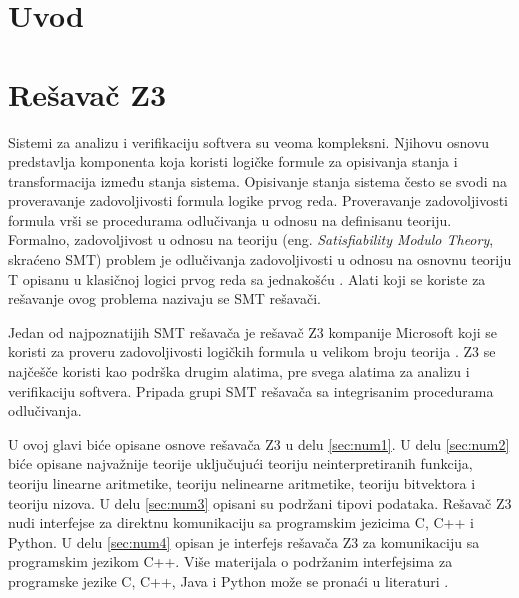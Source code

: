 \documentclass[12pt,oneside]{memoir}
\begin{document}
\frontmatter
\naslovna
\komisija
\apstrakt
\tableofcontents*

\mainmatter

\chapter{Uvod}


\chapter{Rešavač Z3}
\label{chp:razrada}

Sistemi za analizu i verifikaciju softvera su veoma kompleksni. Njihovu osnovu predstavlja komponenta koja koristi logičke formule za opisivanja stanja i transformacija između stanja sistema. Opisivanje stanja sistema često se svodi na proveravanje zadovoljivosti formula logike prvog reda. 
Proveravanje zadovoljivosti formula vrši se procedurama odlučivanja u odnosu na definisanu teoriju. Formalno, zadovoljivost u odnosu na teoriju (eng. \textit{Satisfiability Modulo Theory}, skraćeno SMT) problem je odlučivanja zadovoljivosti u odnosu na osnovnu teoriju T opisanu u klasičnoj logici prvog reda sa jednakošću \cite{Barrett}. Alati koji se koriste za rešavanje ovog problema nazivaju se SMT rešavači. 
\par

Jedan od najpoznatijih SMT rešavača je rešavač Z3 kompanije Microsoft koji se koristi za proveru zadovoljivosti logičkih formula u velikom broju teorija \cite{EfficientSMTSolver}. Z3 se najčešče koristi kao podrška drugim alatima, pre svega alatima za analizu i verifikaciju softvera. Pripada grupi SMT rešavača sa integrisanim procedurama odlučivanja.
\par
U ovoj glavi biće opisane osnove rešavača Z3 u delu \ref{sec:num1}. U delu \ref{sec:num2} biće opisane najvažnije teorije uključujući teoriju neinterpretiranih funkcija, teoriju linearne aritmetike, teoriju nelinearne aritmetike, teoriju bitvektora i teoriju nizova. U delu \ref{sec:num3} opisani su podržani tipovi podataka. Rešavač Z3 nudi interfejse za direktnu komunikaciju sa programskim jezicima C, C++ i Python. U delu \ref{sec:num4} opisan je interfejs rešavača Z3 za komunikaciju sa programskim jezikom C++. Više materijala o podržanim interfejsima za programske jezike C, C++, Java i Python može se pronaći u literaturi \cite{api}.
\end{document}
